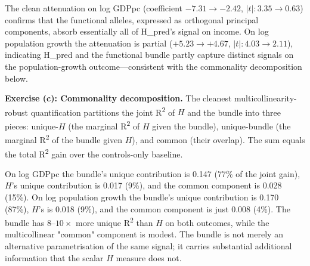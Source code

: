 \documentclass[11pt,letterpaper]{article}
\begin{document}
\begin{table}[H]
\centering
\small
\caption{H\_pred coefficient evolution with PCA-3 bundle (Exercise b). The 8 functional alleles are replaced by their first three principal components (94\% of bundle variance) to remove within-bundle collinearity. On log GDPpc the H\_pred coefficient attenuates cleanly toward zero ($|t|: 3.35 \to 0.63$); on log pop growth attenuation is partial, indicating H\_pred retains some unique signal on the demographic-growth outcome beyond what the bundle captures.}
\label{tab:h-pred-evolution-pca}

\end{table}

The clean attenuation on log GDPpc (coefficient $-7.31 \to -2.42$, $|t|: 3.35 \to 0.63$) confirms that the functional alleles, expressed as orthogonal principal components, absorb essentially all of H\_pred's signal on income. On log population growth the attenuation is partial ($+5.23 \to +4.67$, $|t|: 4.03 \to 2.11$), indicating H\_pred and the functional bundle partly capture distinct signals on the population-growth outcome—consistent with the commonality decomposition below.

\textbf{Exercise (c): Commonality decomposition.}
The cleanest multicollinearity-robust quantification partitions the joint R\textsuperscript{2} of $H$ and the bundle into three pieces: unique-$H$ (the marginal R\textsuperscript{2} of $H$ given the bundle), unique-bundle (the marginal R\textsuperscript{2} of the bundle given $H$), and common (their overlap). The sum equals the total R\textsuperscript{2} gain over the controls-only baseline.

\begin{table}[H]
\centering
\small
\caption{Commonality decomposition of joint R\textsuperscript{2} between H\_pred and the 8-locus functional-allele bundle (Exercise c). On both outcomes the bundle's unique contribution dwarfs $H$'s, and the common (multicollinear) component is small. The bundle is strictly the more informative substrate.}
\label{tab:h-pred-commonality}

\end{table}

On log GDPpc the bundle's unique contribution is 0.147 (77\% of the joint gain), $H$'s unique contribution is 0.017 (9\%), and the common component is 0.028 (15\%). On log population growth the bundle's unique contribution is 0.170 (87\%), $H$'s is 0.018 (9\%), and the common component is just 0.008 (4\%). The bundle has $8$--$10\times$ more unique R\textsuperscript{2} than $H$ on both outcomes, while the multicollinear "common" component is modest. The bundle is not merely an alternative parametrisation of the same signal; it carries substantial additional information that the scalar $H$ measure does not.
\end{document}
